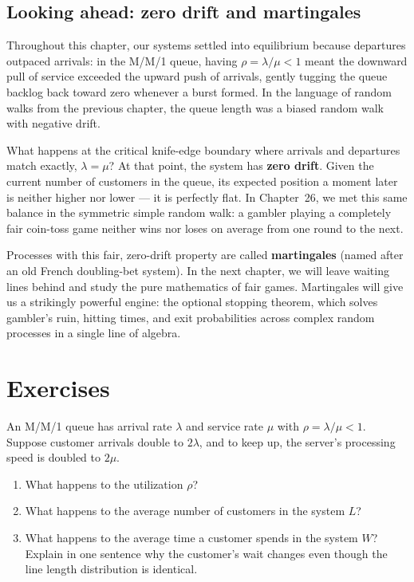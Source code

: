 \subsection{Looking ahead: zero drift and martingales}
\label{ch27:looking-ahead}

Throughout this chapter, our systems settled into equilibrium because departures outpaced arrivals:
in the M/M/1 queue, having $\rho = \lambda/\mu < 1$ meant the downward pull of service exceeded the
upward push of arrivals, gently tugging the queue backlog back toward zero whenever a burst formed.
In the language of random walks from the previous chapter, the queue length was a biased random walk
with negative drift.

What happens at the critical knife-edge boundary where arrivals and departures match exactly,
$\lambda = \mu$? At that point, the system has \textbf{zero drift}. Given the current number of
customers in the queue, its expected position a moment later is neither higher nor lower --- it is
perfectly flat. In Chapter~26, we met this same balance in the symmetric simple random
walk: a gambler playing a completely fair coin-toss game neither wins nor loses on average from one
round to the next.

Processes with this fair, zero-drift property are called \textbf{martingales} (named after an old
French doubling-bet system). In the next chapter, we will leave waiting lines behind and study the
pure mathematics of fair games. Martingales will give us a strikingly powerful engine: the optional
stopping theorem, which solves gambler's ruin, hitting times, and exit probabilities across complex
random processes in a single line of algebra.

\section{Exercises}
\label{ch27:exercises}

\begin{exercise}
\label{ch27:exr-mental-scale}
An M/M/1 queue has arrival rate $\lambda$ and service rate $\mu$ with $\rho = \lambda/\mu < 1$.
Suppose customer arrivals double to $2\lambda$, and to keep up, the server's processing speed is
doubled to $2\mu$.
\begin{enumerate}[label=(\alph*)]
  \item What happens to the utilization $\rho$?
  \item What happens to the average number of customers in the system $L$?
  \item What happens to the average time a customer spends in the system $W$? Explain in one sentence
  why the customer's wait changes even though the line length distribution is identical.
\end{enumerate}
\end{exercise}

